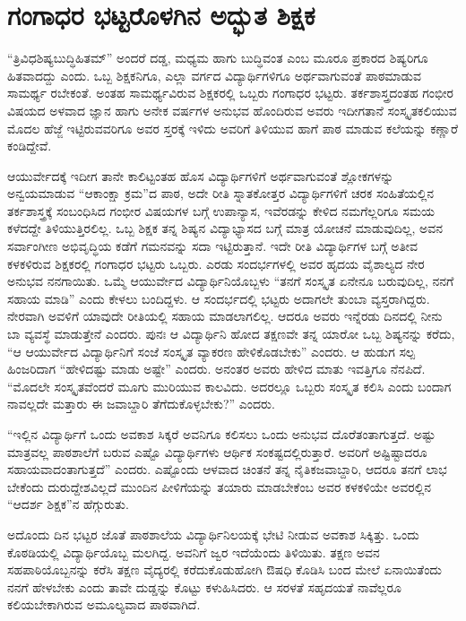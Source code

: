 {\section*{ಗಂಗಾಧರ ಭಟ್ಟರೊಳಗಿನ ಅದ್ಭುತ ಶಿಕ್ಷಕ }

“ತ್ರಿವಿಧಶಿಷ್ಯಬುದ್ಧಿಹಿತಮ್” ಅಂದರೆ ದಡ್ಡ, ಮಧ್ಯಮ ಹಾಗು ಬುದ್ಧಿವಂತ ಎಂಬ ಮೂರೂ ಪ್ರಕಾರದ ಶಿಷ್ಯರಿಗೂ ಹಿತವಾದದ್ದು ಎಂದು. ಒಬ್ಬ ಶಿಕ್ಷಕನಿಗೂ, ಎಲ್ಲಾ ವರ್ಗದ ವಿದ್ಯಾರ್ಥಿಗಳಿಗೂ ಅರ್ಥವಾಗುವಂತೆ ಪಾಠಮಾಡುವ ಸಾಮರ್ಥ್ಯ ರಬೇಕಂತೆ. ಅಂತಹ ಸಾಮರ್ಥ್ಯವಿರುವ ಶಿಕ್ಷಕರಲ್ಲಿ ಒಬ್ಬರು ಗಂಗಾಧರ ಭಟ್ಟರು. ತರ್ಕ\-ಶಾಸ್ತ್ರದಂತಹ ಗಂಭೀರ ವಿಷಯದ ಅಳವಾದ ಜ್ಞಾನ ಹಾಗು ಅನೇಕ ವರ್ಷಗಳ ಅನುಭವ ಹೊಂದಿರುವ ಅವರು ಇದೀಗತಾನೆ ಸಂಸ್ಕೃತಕಲಿಯುವ ಮೊದಲ ಹೆಜ್ಜೆ ಇಟ್ಟಿರುವವರಿಗೂ ಅವರ ಸ್ತರಕ್ಕೆ ಇಳಿದು ಅವರಿಗೆ ತಿಳಿಯುವ ಹಾಗೆ ಪಾಠ ಮಾಡುವ ಕಲೆಯನ್ನು ಕಣ್ಣಾರೆ ಕಂಡಿದ್ದೇವೆ.

ಆಯುರ್ವೇದಕ್ಕೆ ಇದೀಗ ತಾನೇ ಕಾಲಿಟ್ಟಂತಹ ಹೊಸ ವಿದ್ಯಾರ್ಥಿಗಳಿಗೆ ಅರ್ಥವಾಗುವಂತೆ ಶ್ಲೋಕಗಳನ್ನು ಅನ್ವಯಮಾಡುವ “ಆಕಾಂಕ್ಷಾ ಕ್ರಮ”ದ ಪಾಠ, ಅದೇ ರೀತಿ ಸ್ನಾತಕೋತ್ತರ ವಿದ್ಯಾರ್ಥಿಗಳಿಗೆ ಚರಕ ಸಂಹಿತೆಯಲ್ಲಿನ ತರ್ಕಶಾಸ್ತ್ರಕ್ಕೆ ಸಂಬಂಧಿಸಿದ ಗಂಭೀರ ವಿಷಯಗಳ ಬಗ್ಗೆ ಉಪಾನ್ಯಾಸ, ಇವೆರಡನ್ನು ಕೇಳಿದ ನಮಗೆಲ್ಲರಿಗೂ ಸಮಯ ಕಳೆದದ್ದೇ ತಿಳಿಯುತ್ತಿರಲಿಲ್ಲ.
ಒಬ್ಬ ಶಿಕ್ಷಕ ತನ್ನ ಶಿಷ್ಯನ ವಿದ್ಯಾಭ್ಯಾಸದ ಬಗ್ಗೆ ಮಾತ್ರ ಯೋಚನೆ ಮಾಡುವುದಿಲ್ಲ, ಅವನ ಸರ್ವಾಂಗೀಣ ಅಭಿವೃದ್ಧಿಯ ಕಡೆಗೆ ಗಮನ\-ವನ್ನು ಸದಾ ಇಟ್ಟಿರುತ್ತಾನೆ. ಇದೇ ರೀತಿ ವಿದ್ಯಾರ್ಥಿಗಳ ಬಗ್ಗೆ ಅತೀವ ಕಳಕಳಿರುವ ಶಿಕ್ಷಕರಲ್ಲಿ ಗಂಗಾಧರ ಭಟ್ಟರು ಒಬ್ಬರು. ಎರಡು ಸಂದರ್ಭಗಳಲ್ಲಿ ಅವರ ಹೃದಯ ವೈಶಾಲ್ಯದ ನೇರ ಅನುಭವ ನನಗಾಯಿತು. ಒಮ್ಮೆ ಆಯುರ್ವೇದ ವಿದ್ಯಾರ್ಥಿನಿಯೊಬ್ಬಳು “ತನಗೆ ಸಂಸ್ಕೃತ ಏನೇನೂ ಬರುವುದಿಲ್ಲ, ನನಗೆ ಸಹಾಯ ಮಾಡಿ” ಎಂದು ಕೇಳಲು ಬಂದಿದ್ದಳು. ಆ ಸಂದರ್ಭದಲ್ಲಿ ಭಟ್ಟರು ಅದಾಗಲೇ ತುಂಬಾ ವ್ಯಸ್ತರಾಗಿದ್ದರು. ನೇರವಾಗಿ ಅವಳಿಗೆ ಯಾವುದೇ ರೀತಿಯಲ್ಲಿ ಸಹಾಯ ಮಾಡಲಾಗಲಿಲ್ಲ. ಆದರೂ ಅವರು ಇನ್ನೆರಡು ದಿನದಲ್ಲಿ ನೀನು ಬಾ ವ್ಯವಸ್ಥೆ ಮಾಡುತ್ತೇನೆ ಎಂದರು. ಪುನಃ ಆ ವಿದ್ಯಾರ್ಥಿನಿ ಹೋದ ತಕ್ಷಣವೇ ತನ್ನ ಯಾರೋ ಒಬ್ಬ ಶಿಷ್ಯನನ್ನು ಕರೆದು, “ಆ ಆಯುರ್ವೇದ ವಿದ್ಯಾರ್ಥಿನಿಗೆ ಸಂಜೆ ಸಂಸ್ಕೃತ ವ್ಯಾಕರಣ ಹೇಳಿಕೊಡಬೇಕು” ಎಂದರು. ಆ ಹುಡುಗ ಸಲ್ಪ ಹಿಂಜರಿದಾಗ “ಹೇಳಿದಷ್ಟು ಮಾಡು ಅಷ್ಟೇ” ಎಂದರು. ಅನಂತರ ಅವರು ಹೇಳಿದ ಮಾತು ಇವತ್ತಿಗೂ ನೆನಪಿದೆ. “ಮೊದಲೇ ಸಂಸ್ಕೃತವೆಂದರೆ ಮೂಗು ಮುರಿಯುವ ಕಾಲವಿದು. ಅದರಲ್ಲೂ  ಒಬ್ಬರು ಸಂಸ್ಕೃತ ಕಲಿಸಿ ಎಂದು ಬಂದಾಗ ನಾವಲ್ಲದೇ ಮತ್ತಾರು ಈ ಜವಾಬ್ದಾರಿ ತೆಗೆದುಕೊಳ್ಳಬೇಕು?” ಎಂದರು.

“ಇಲ್ಲಿನ ವಿದ್ಯಾರ್ಥಿಗೆ ಒಂದು ಅವಕಾಶ ಸಿಕ್ಕರೆ ಅವನಿಗೂ ಕಲಿಸಲು ಒಂದು ಅನುಭವ ದೊರೆತಂತಾಗುತ್ತದೆ. ಅಷ್ಟು ಮಾತ್ರವಲ್ಲ ಪಾಠಶಾಲೆಗೆ ಬರುವ ಎಷ್ಟೊ ವಿದ್ಯಾರ್ಥಿಗಳು ಆರ್ಥಿಕ ಸಂಕಷ್ಟದಲ್ಲಿರುತ್ತಾರೆ. ಅವರಿಗೆ ಅಷ್ಟಿಷ್ಟಾದರೂ ಸಹಾಯವಾದಂತಾಗುತ್ತದೆ” ಎಂದರು. 
ಎಷ್ಟೊಂದು ಆಳವಾದ ಚಿಂತನೆ ತನ್ನ ನೈತಿಕಜವಾಬ್ದಾರಿ, ಆದರೂ ತನಗೆ ಲಾಭ ಬೇಕೆಂದು ದುರುದ್ದೇಶವಿಲ್ಲದೆ ಮುಂದಿನ ಪೀಳಿಗೆಯನ್ನು ತಯಾರು ಮಾಡಬೇಕೆಂಬ ಅವರ ಕಳಕಳಿಯೇ ಅವರಲ್ಲಿನ “ಆದರ್ಶ ಶಿಕ್ಷಕ”ನ ಹೆಗ್ಗುರುತು.

ಅದೊಂದು ದಿನ ಭಟ್ಟರ ಜೊತೆ ಪಾಠಶಾಲೆಯ ವಿದ್ಯಾರ್ಥಿನಿಲಯಕ್ಕೆ ಭೇಟಿ ನೀಡುವ ಅವಕಾಶ ಸಿಕ್ಕಿತ್ತು. ಒಂದು ಕೊಠಡಿಯಲ್ಲಿ ವಿದ್ಯಾರ್ಥಿಯೊಬ್ಬ ಮಲಗಿದ್ದ. ಅವನಿಗೆ ಜ್ವರ ಇದೆಯೆಂದು ತಿಳಿಯಿತು. ತಕ್ಷಣ ಅವನ ಸಹಪಾಠಿಯೊಬ್ಬನನ್ನು ಕರೆಸಿ ತಕ್ಷಣ ವೈದ್ಯರಲ್ಲಿ ಕರೆದುಕೊಡುಹೋಗಿ ಔಷಧಿ ಕೊಡಿಸಿ ಬಂದ ಮೇಲೆ ಏನಾಯಿತೆಂದು ನನಗೆ ಹೇಳಬೇಕು ಎಂದು ತಾವೇ ದುಡ್ಡನ್ನು ಕೊಟ್ಟು ಕಳುಹಿಸಿದರು. ಆ ಸರಳತೆ ಸಹೃದಯತೆ ನಾವೆಲ್ಲರೂ ಕಲಿಯಬೇಕಾಗಿರುವ ಅಮೂಲ್ಯವಾದ ಪಾಠವಾಗಿದೆ.

}
